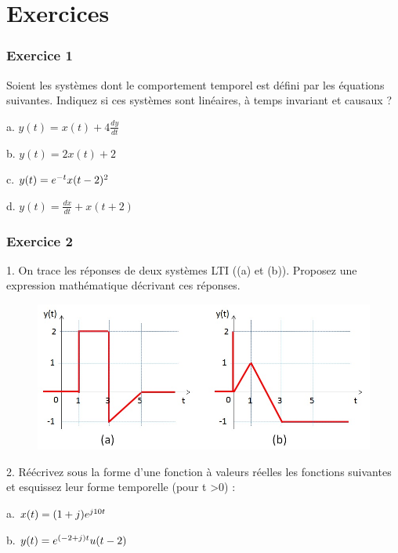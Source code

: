 	\vspace{1\baselineskip}

	
	
	\section{Exercices}
	
	\subsubsection{Exercice 1} 
	Soient les systèmes dont le comportement temporel est défini
        par les équations suivantes. Indiquez si ces systèmes sont
        linéaires, à temps invariant et causaux ?
	
	a. $y(t) = x(t)+4\frac{dy}{dt}$
	
	b. $y(t) = 2x(t)+2$
	
	c. $y(t)=e^{-t}x(t-2)^{2}$
	
	d. $y(t)=\frac{dx}{dt}+x(t+2)$
	
	\vspace{1\baselineskip}
	
	\subsubsection{Exercice 2} 
	1. On trace les réponses de deux systèmes LTI ((a) et
        (b)). Proposez une expression mathématique décrivant ces
        réponses.
	\begin{figure}[htbp]
          \centering \includegraphics[scale=0.5]{images/Exo_2_2.jpg}
	\end{figure}

	
	2. Réécrivez sous la forme d'une fonction à valeurs réelles
        les fonctions suivantes et esquissez leur forme temporelle
        (pour t >0) :
	
	a. $x(t) = (1+j)e^{j 10t}$
	
	b. $y(t) = e^{(-2+j)t} u(t-2)$
	
